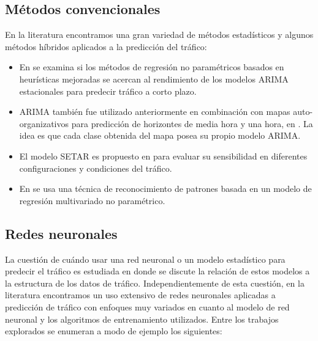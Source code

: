 \documentclass{llncs}
\begin{document}
\subsection{Métodos convencionales}
En la literatura encontramos una gran variedad de métodos estadísticos y algunos métodos híbridos aplicados a la predicción del tráfico:
\begin{itemize}
\item En \cite{smith2002comparison} se examina si los métodos de regresión no paramétricos basados en heurísticas mejoradas se acercan al rendimiento de los modelos ARIMA estacionales para predecir tráfico a corto plazo.
 
\item ARIMA también fue utilizado anteriormente en combinación con mapas auto-organizativos para predicción de horizontes de media hora y una hora, en \cite{van1996combining}. La idea es que cada clase obtenida del mapa posea su propio modelo ARIMA. 

\item El modelo SETAR es propuesto en \cite{ishak2002performance} para evaluar su sensibilidad en diferentes configuraciones y condiciones del tráfico.

\item En \cite{clark2003traffic} se usa una técnica de reconocimiento de patrones basada en un modelo de regresión multivariado no paramétrico.


\end{itemize}






\subsection{Redes neuronales}
La cuestión de cuándo usar una red neuronal o un modelo estadístico para predecir el tráfico es estudiada en \cite{kirby1997should} donde se discute la relación de estos modelos a la estructura de los datos de tráfico. Independientemente de esta cuestión, en la literatura encontramos un uso extensivo de redes neuronales aplicadas a predicción de tráfico con enfoques muy variados en cuanto al modelo de red neuronal y los algoritmos de entrenamiento utilizados. Entre los trabajos explorados se enumeran a modo de ejemplo los siguientes:
\end{document}
